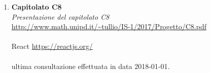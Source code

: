 \begin{enumerate}
\item 
	\textbf{Capitolato C8}\\
	\textit{Presentazione del capitolato C8}\\
	\url{http://www.math.unipd.it/~tullio/IS-1/2017/Progetto/C8.pdf}\\
	\\
	React \url{https://reactjs.org/}\\
	\\
	ultima consultazione effettuata in data 2018-01-01.

\end{enumerate}
